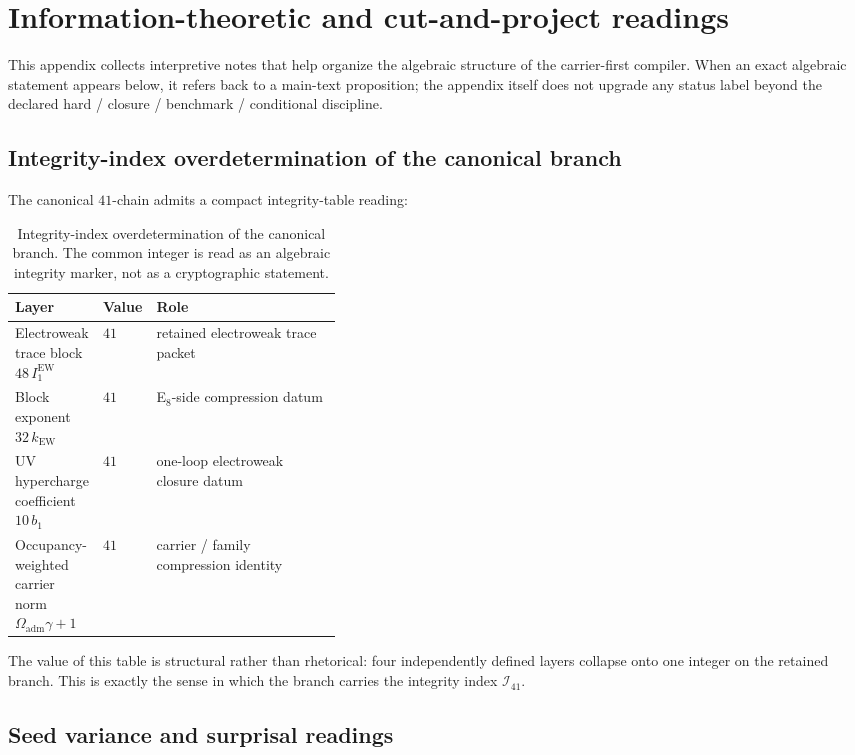 \documentclass[11pt,a4paper]{article}
\theoremstyle{definition}
\theoremstyle{remark}
\newcommand{\Oadm}{\Omega_{\mathrm{adm}}}
\begin{document}
\section{Information-theoretic and cut-and-project readings}
\label{app:info-readings}

This appendix collects interpretive notes that help organize the algebraic structure of the carrier-first compiler. When an exact algebraic statement appears below, it refers back to a main-text proposition; the appendix itself does not upgrade any status label beyond the declared hard / closure / benchmark / conditional discipline.

\subsection{Integrity-index overdetermination of the canonical branch}

The canonical $41$-chain admits a compact integrity-table reading:

\begin{table}[H]
\centering
\small
\begin{tabularx}{\linewidth}{@{}>{\raggedright\arraybackslash}p{0.26\linewidth}>{\raggedleft\arraybackslash}p{0.12\linewidth}Y@{}}
\toprule
Layer & Value & Role \\
\midrule
Electroweak trace block $48\,I_1^{\mathrm{EW}}$ & $41$ & retained electroweak trace packet \\
Block exponent $32\,k_{\mathrm{EW}}$ & $41$ & E$_8$-side compression datum \\
UV hypercharge coefficient $10\,b_1$ & $41$ & one-loop electroweak closure datum \\
Occupancy-weighted carrier norm $\Oadm\gamma+1$ & $41$ & carrier / family compression identity \\
\bottomrule
\end{tabularx}
\caption{Integrity-index overdetermination of the canonical branch. The common integer is read as an algebraic integrity marker, not as a cryptographic statement.}
\label{tab:checksum-41}
\end{table}

The value of this table is structural rather than rhetorical: four independently defined layers collapse onto one integer on the retained branch. This is exactly the sense in which the branch carries the integrity index $\mathcal I_{41}$.

\subsection{Seed variance and surprisal readings}
\end{document}
